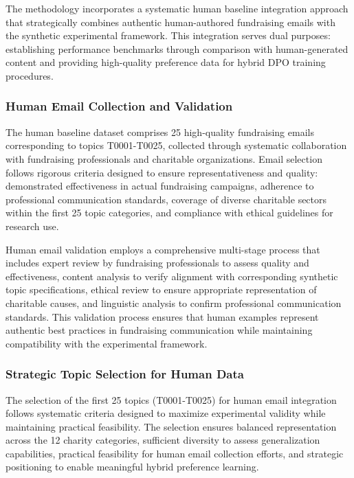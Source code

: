 The methodology incorporates a systematic human baseline integration approach that strategically combines authentic human-authored fundraising emails with the synthetic experimental framework. This integration serves dual purposes: establishing performance benchmarks through comparison with human-generated content and providing high-quality preference data for hybrid DPO training procedures.

\subsubsection{Human Email Collection and Validation}

The human baseline dataset comprises 25 high-quality fundraising emails corresponding to topics T0001-T0025, collected through systematic collaboration with fundraising professionals and charitable organizations. Email selection follows rigorous criteria designed to ensure representativeness and quality: demonstrated effectiveness in actual fundraising campaigns, adherence to professional communication standards, coverage of diverse charitable sectors within the first 25 topic categories, and compliance with ethical guidelines for research use.

Human email validation employs a comprehensive multi-stage process that includes expert review by fundraising professionals to assess quality and effectiveness, content analysis to verify alignment with corresponding synthetic topic specifications, ethical review to ensure appropriate representation of charitable causes, and linguistic analysis to confirm professional communication standards. This validation process ensures that human examples represent authentic best practices in fundraising communication while maintaining compatibility with the experimental framework.

\subsubsection{Strategic Topic Selection for Human Data}

The selection of the first 25 topics (T0001-T0025) for human email integration follows systematic criteria designed to maximize experimental validity while maintaining practical feasibility. The selection ensures balanced representation across the 12 charity categories, sufficient diversity to assess generalization capabilities, practical feasibility for human email collection efforts, and strategic positioning to enable meaningful hybrid preference learning.

